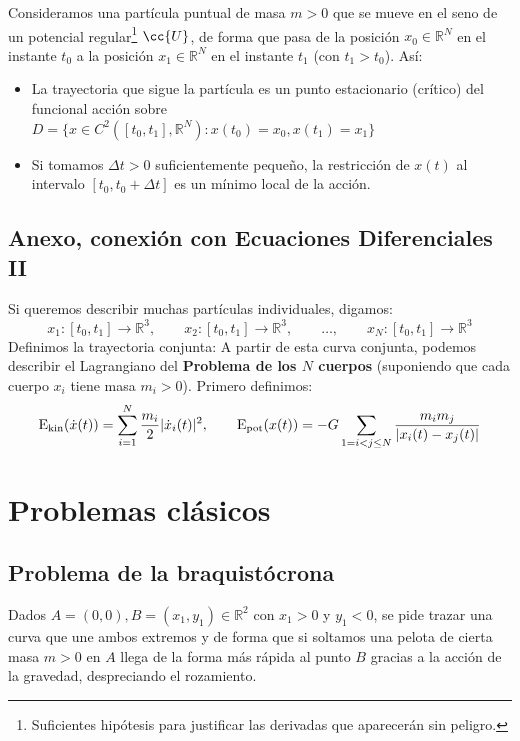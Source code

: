 \noindent
Consideramos una partícula puntual de masa $m>0$ que se mueve en el seno de un potencial regular\footnote{Suficientes hipótesis para justificar las derivadas que aparecerán sin peligro.} $\cc{U}$, de forma que pasa de la posición $x_0\in \mathbb{R}^N$ en el instante $t_0$ a la posición $x_1\in \mathbb{R}^N$ en el instante $t_1$ (con $t_1>t_0$). Así:
\begin{itemize}
    \item La trayectoria que sigue la partícula es un punto estacionario (crítico) del funcional acción sobre $D = \{x\in C^2([t_0,t_1],\mathbb{R}^N) : x(t_0) = x_0, x(t_1) = x_1\}$
    \item Si tomamos $\Delta t > 0$ suficientemente pequeño, la restricción de $x(t)$ al intervalo $[t_0,t_0+\Delta t]$ es un mínimo local de la acción.
\end{itemize}

\subsection{Anexo, conexión con Ecuaciones Diferenciales II}
\noindent
Si queremos describir muchas partículas individuales, digamos:
\begin{equation*}
    x_1:[t_0, t_1] \to \mathbb{R}^3, \qquad 
    x_2:[t_0, t_1] \to \mathbb{R}^3, \qquad 
    \ldots, \qquad 
    x_N:[t_0, t_1] \to \mathbb{R}^3
\end{equation*}
Definimos la trayectoria conjunta: 
A partir de esta curva conjunta, podemos describir el Lagrangiano del \textbf{Problema de los $N$ cuerpos} (suponiendo que cada cuerpo $x_i$ tiene masa $m_i > 0$). Primero definimos:
\begin{equation*}
    \operatorname{\text{E}_{\text{kin}}}(\dot{x}(t)) = \sum_{i=1}^{N} \frac{m_i}{2} |\dot{x}_i(t)|^2, \qquad \operatorname{\text{E}_{\text{pot}}}(x(t)) = -G \sum_{1=i<j\leq N} \frac{m_im_j}{|x_i(t) - x_j(t)|}
\end{equation*}

\section{Problemas clásicos}
\subsection{Problema de la braquistócrona}
\noindent
Dados $A = (0,0),B=(x_1,y_1)\in \mathbb{R}^2$ con $x_1>0$ y $y_1<0$, se pide trazar una curva que une ambos extremos y de forma que si soltamos una pelota de cierta masa $m>0$ en $A$ llega de la forma más rápida al punto $B$ gracias a la acción de la gravedad, despreciando el rozamiento.\\ %

